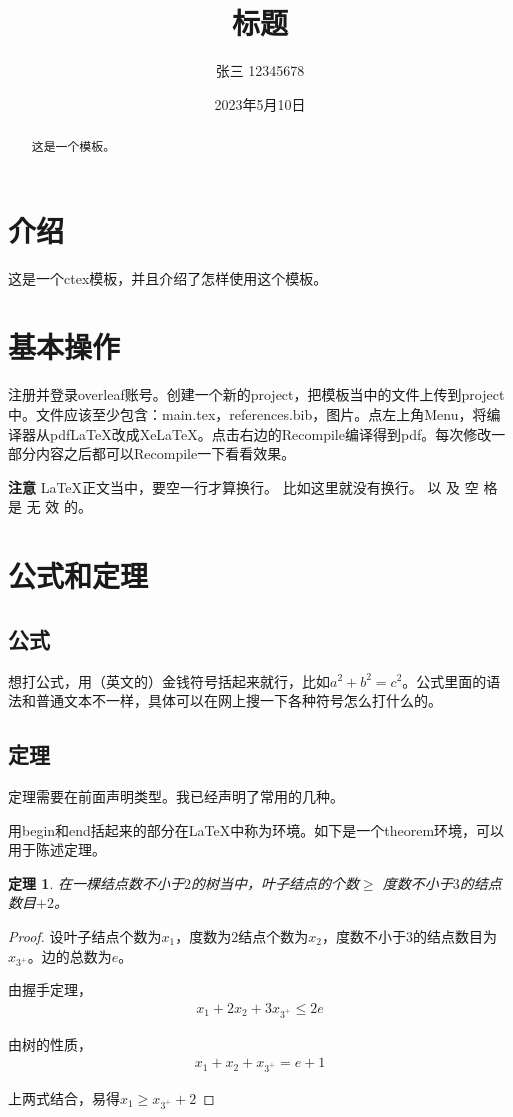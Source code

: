 \documentclass{ctexart}
\title{标题}
\author{张三 12345678}
\date{2023年5月10日}
\newtheorem{theorem}{定理}
\begin{document}
\maketitle
\begin{abstract}
	这是一个模板。
\end{abstract}

\newpage

\tableofcontents
\newpage

\section{介绍}
这是一个ctex模板，并且介绍了怎样使用这个模板。

\section{基本操作}
注册并登录overleaf账号。创建一个新的project，把模板当中的文件上传到project中。文件应该至少包含：main.tex，references.bib，图片。点左上角Menu，将编译器从pdfLaTeX改成XeLaTeX。点击右边的Recompile编译得到pdf。每次修改一部分内容之后都可以Recompile一下看看效果。

\textbf{注意} LaTeX正文当中，要空一行才算换行。
比如这里就没有换行。
以 及 空 格 是 无 效 的。

\section{公式和定理}
\subsection{公式}
想打公式，用（英文的）金钱符号括起来就行，比如$a^2+b^2=c^2$。公式里面的语法和普通文本不一样，具体可以在网上搜一下各种符号怎么打什么的。

\subsection{定理}
定理需要在前面声明类型。我已经声明了常用的几种。

用begin和end括起来的部分在LaTeX中称为环境。如下是一个theorem环境，可以用于陈述定理。
\begin{theorem}\label{thm:nodenum} %
	在一棵结点数不小于$2$的树当中，叶子结点的个数$\geq$ 度数不小于$3$的结点数目$+2$。
\end{theorem}

\begin{proof}
	设叶子结点个数为$x_{1}$，度数为$2$结点个数为$x_{2}$，度数不小于$3$的结点数目为$x_{3^+}$。边的总数为$e$。

	由握手定理，
	\begin{align*}
		x_{1}+2x_{2}+3x_{3^+}\leq 2e
	\end{align*}

	由树的性质，
	\begin{align*}
		x_{1}+x_{2}+x_{3^+}=e+1
	\end{align*}

	上两式结合，易得$x_{1}\geq x_{3^+}+2$
\end{proof}
\end{document}
